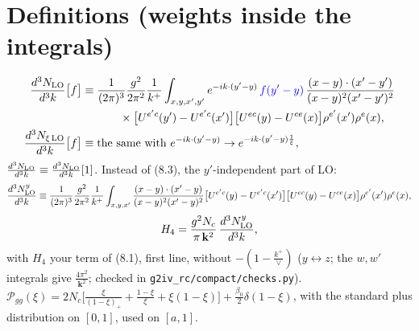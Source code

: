 \documentclass[10pt]{article}
\numberwithin{equation}{section}
\newcommand{\new}[1]{{\color{blue}#1}}
\begin{document}
\section{Definitions (weights inside the integrals)}
\begin{align}
\frac{d^3N_{\rm LO}}{d^3k}\big[f\big]\equiv{}&\frac{1}{(2\pi)^{3}}\frac{g^{2}}{2\pi^{2}}\frac{1}{k^{+}}\int_{x,y,x',y'}e^{-ik\cdot(y'-y)}\,\new{f(y'-y)}\,\frac{(x-y)\cdot(x'-y')}{(x-y)^{2}(x'-y')^{2}}\notag\\&\qquad\times\big[U^{e'c}(y')-U^{e'c}(x')\big]\big[U^{ec}(y)-U^{ce}(x)\big]\rho^{e'}(x')\rho^{e}(x),\label{eq:LOf}\\
\frac{d^3N_{\xi\,\rm LO}}{d^3k}\big[f\big]\equiv{}&\text{the same with }e^{-ik\cdot(y'-y)}\to e^{-ik\cdot(y'-y)\frac1\xi},\label{eq:LOxif}
\end{align}
$\frac{d^3N_{\rm LO}}{d^3k}\equiv\frac{d^3N_{\rm LO}}{d^3k}[1]$. Instead of (8.3), the $y'$-independent part of LO:
\begin{equation}
\frac{d^3N^{y}_{\rm LO}}{d^3k}\equiv\frac{1}{(2\pi)^{3}}\frac{g^{2}}{2\pi^{2}}\frac{1}{k^{+}}\int_{x,y,x'}\frac{(x-y)\cdot(x'-y)}{(x-y)^{2}(x'-y)^{2}}\big[U^{e'c}(y)-U^{e'c}(x')\big]\big[U^{ec}(y)-U^{ce}(x)\big]\rho^{e'}(x')\rho^{e}(x),\end{equation}\begin{equation}H_4=\frac{g^2N_c}{\pi\,\mathbf k^2}\,\frac{d^3N^{y}_{\rm LO}}{d^3k},\label{eq:H4}
\end{equation}
with $H_4$ your term of (8.1), first line, without $-(1-\frac{k^+}{\vee})$ ($y\leftrightarrow z$; the $w,w'$ integrals give $\frac{4\pi^2}{\mathbf k^2}$; checked in \texttt{g2iv\_rc/compact/checks.py}).
$\mathcal P_{gg}(\xi)=2N_c\big[\frac{\xi}{(1-\xi)_+}+\frac{1-\xi}{\xi}+\xi(1-\xi)\big]+\frac{\beta_0}{2}\delta(1-\xi)$, with the standard plus distribution on $[0,1]$, used on $[a,1]$.
\end{document}
